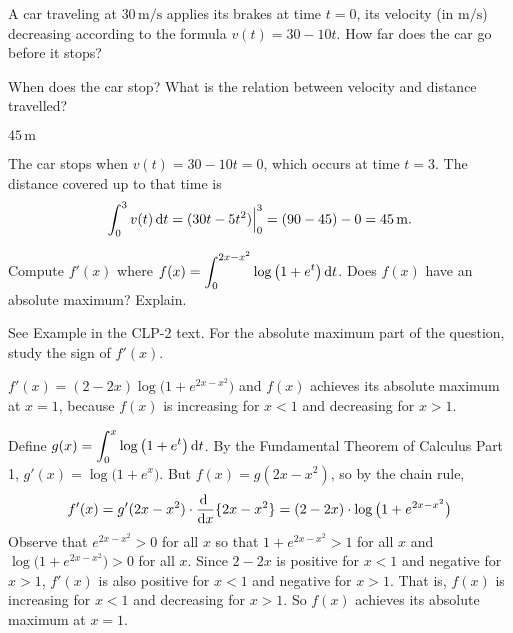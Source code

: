 \begin{Mquestion}[2016Q2]
A car traveling at $30\,\textrm{m}/\textrm{s}$ applies its brakes at time $t=0$,
its velocity (in $\textrm{m}/\textrm{s}$) decreasing according to the formula
$v(t) = 30 - 10t$. How far does the car go before it stops?
\end{Mquestion}

\begin{hint}
When does the car stop?
What is the relation between velocity and distance travelled?
\end{hint}

\begin{answer}
$45\,\textrm{m}$
\end{answer}

\begin{solution}
The car stops when $v(t)=30-10t=0$, which occurs at time $t = 3$.
The distance covered up to that time is
\begin{align*}
\int_0^3 v(t)\,\mathrm{d}t = (30t - 5t^2)\Big|_{0}^{3} = (90-45)-0 = 45\,\textrm{m}.
\end{align*}
\end{solution}


\begin{Mquestion}[1998A]
Compute $f'(x)$ where $f(x)= \displaystyle\int_0^{2x-x^2}\log\big(1+e^t\big)\,\mathrm{d}t$.
Does $f(x)$ have an absolute maximum? Explain.
\end{Mquestion}

\begin{hint}
See Example  in the
CLP-2 text. For the absolute maximum part of the question, study the sign
of $f'(x)$.
\end{hint}

\begin{answer}
$f'(x)=(2-2x)\log\big(1+e^{2x-x^2}\big)$
and $f(x)$ achieves its absolute maximum at $x=1$, because
$f(x)$ is increasing for $x<1$ and decreasing for $x>1$.
\end{answer}

\begin{solution}
Define $g(x) = \displaystyle\int_0^x\log\big(1+e^t\big)\,\mathrm{d}t$. By the Fundamental
Theorem of Calculus Part 1, $g'(x) = \log\big(1+e^x\big)$. But $f(x)=g(2x-x^2)$,
so by the chain rule,
\begin{align*}
f'(x)=g'(2x-x^2)\cdot \diff{}{x}\{2x-x^2\}
=(2-2x)\cdot\log\big(1+e^{2x-x^2}\big)
\end{align*}
Observe that $e^{2x-x^2}>0$ for all $x$ so that $1+e^{2x-x^2}>1$ for all
$x$ and $\log\big(1+e^{2x-x^2}\big)>0$ for all $x$. Since $2-2x$ is positive
for $x<1$ and negative for $x>1$, $f'(x)$ is also positive for $x<1$ and
negative for $x>1$. That is, $f(x)$ is increasing for $x<1$ and decreasing
for $x>1$. So $f(x)$ achieves its absolute maximum at $x=1$.

\end{solution}


